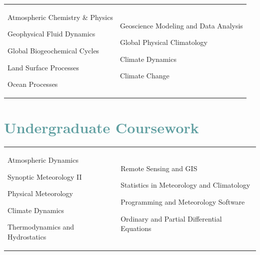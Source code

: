 \documentclass[margin,line,palatino,courier,10pt]{res}
\newenvironment{list1}{
  \begin{list}{\ding{113}}{%
      \setlength{\itemsep}{0in}
      \setlength{\parsep}{0in} \setlength{\parskip}{0in}
      \setlength{\topsep}{0in} \setlength{\partopsep}{0in}
      \setlength{\leftmargin}{0.17in}}}{\end{list}}
\begin{document}
\begin{resume}
\begin{tabular}{@{}p{2.2in}p{3in}}
\begin{list1}
\item Atmospheric Chemistry \& Physics 
\item Geophysical Fluid Dynamics
\item Global Biogeochemical Cycles
\item Land Surface Processes
\item Ocean Processes
\end{list1}
&
\begin{list1}
\item Geoscience Modeling and Data Analysis
\item Global Physical Climatology
\item Climate Dynamics
\item Climate Change
\end{list1}


\end{tabular}

\newpage
\section{\sc \textcolor{CadetBlue}{\large{Undergraduate Coursework}}}

\begin{tabular}{@{}p{2.2in}p{3in}}
\vspace*{0.04in}
\begin{list1}
\item Atmospheric Dynamics
\item Synoptic Meteorology II
\item Physical Meteorology
\item Climate Dynamics
\item Thermodynamics and Hydrostatics 
\end{list1}
&
\begin{list1}
\item Remote Sensing and GIS
\item Statistics in Meteorology and Climatology
\item Programming and Meteorology Software
\item Ordinary and Partial Differential Equations
\end{list1}

\end{tabular}


\vspace{-0.1in}
\noindent\makebox[\linewidth][r]{\rule{\textwidth}{5pt}}
\vspace{-0.3in}


\end{resume}
\end{document}
